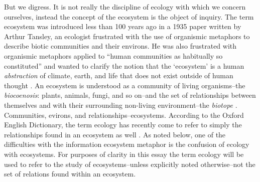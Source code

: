 But we digress. It is not really the discipline of ecology with which we concern ourselves, instead the concept of the ecosystem is the object of inquiry. The term ecosystem was introduced less than 100 years ago in a 1935 paper written by Arthur Tansley, an ecologist frustrated with the use of organismic metaphors to describe biotic communities and their environs. He was also frustrated with organismic metaphors applied to “human communities as habitually so constituted” and wanted to clarify the notion that the ‘ecosystem’ is a human \textit{abstraction} of climate, earth, and life that does not exist outside of human thought \cite{tansley_1935}. An ecosystem is understood as a community of living organisms--the \textit{biocoenosis}: plants, animals, fungi, and so on--and the set of relationships between themselves and with their surrounding non-living environment--the \textit{biotope} \cite{tansley_1935, odum_1953}. Communities, evirons, and relationships--ecosystems. According to the Oxford English Dictionary, the term ecology has recently come to refer to simply the relationships found in an ecosystem as well \cite{oed_2008}. As noted below, one of the difficulties with the information ecosystem metaphor is the confusion of ecology with ecosystems. For purposes of clarity in this essay the term ecology will be used to refer to the study of ecosystems--unless explicitly noted otherwise--not the set of relations found within an ecosystem. 

